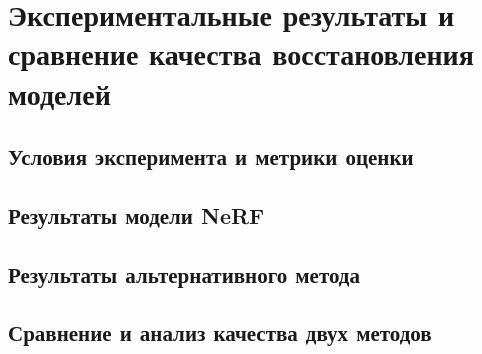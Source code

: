 \chapter{Экспериментальные результаты и сравнение качества восстановления моделей}

\section{Условия эксперимента и метрики оценки}
\section{Результаты модели NeRF}
\section{Результаты альтернативного метода}
\section{Сравнение и анализ качества двух методов}


